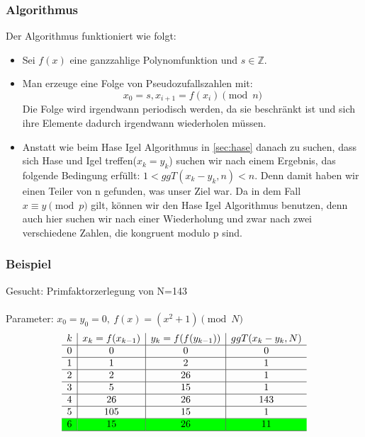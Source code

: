   	\subsubsection{Algorithmus}
  	Der Algorithmus funktioniert wie folgt:
 \begin{itemize}
 	\item Sei $f(x)$ eine ganzzahlige Polynomfunktion und $s \in \mathbb{Z}$.
 
 	\item Man erzeuge eine Folge von Pseudozufallszahlen mit: 
  	\[ 	x_0= s,  x_{i+1}=f(x_i) \pmod n  \]
	Die Folge wird irgendwann periodisch werden, da sie beschr\"ankt ist und sich ihre Elemente dadurch irgendwann wiederholen m\"ussen.


 	\item Anstatt wie beim Hase Igel Algorithmus in \ref{sec:hase} danach zu suchen, dass sich Hase und Igel treffen($x_k=y_k$) suchen wir nach einem Ergebnis, das folgende Bedingung erf\"ullt: $1 < ggT(x_k - y_k, n)< n$. Denn damit haben wir einen Teiler von n gefunden, was unser Ziel war. Da in dem Fall $x \equiv y \pmod p$ gilt, k\"onnen wir den Hase Igel Algorithmus benutzen, denn auch hier suchen wir nach einer Wiederholung und zwar nach zwei verschiedene Zahlen, die kongruent modulo p sind.
 \end{itemize}
 
 	\subsubsection{Beispiel}
 	
 	Gesucht: Primfaktorzerlegung von N=143\\
 	\ \\
 	Parameter: $x_0 = y_0 = 0, \ f(x)=(x^2+1) \pmod N$
 	\[
 	\begin{array}{c|c|c|c}
 	k & x_k = f(x_{k-1}) & y_k = f(f(y_{k-1})) & ggT(x_k - y_k, N) \\ \hline 
 	0 & 0 & 0 & 0 \\ \hline
 	1 & 1 & 2 & 1 \\ \hline
 	2 & 2 & 26 & 1 \\ \hline
 	3 & 5 & 15 & 1 \\ \hline
 	4 & 26 & 26 & 143 \\ \hline
 	5 & 105 & 15 & 1 \\ \hline
 	\cellcolor{green}6 & \cellcolor{green}15 & \cellcolor{green}26 & \cellcolor{green}11 \\ \hline
 	\end{array}
	\]
	\vspace{3mm}
	
